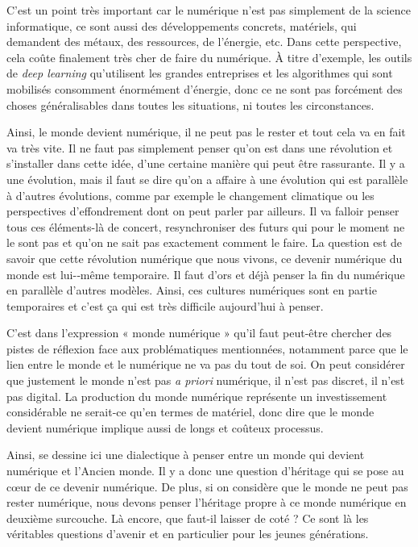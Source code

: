 C'est un point très important car le numérique n'est pas simplement de la science informatique, ce sont aussi des développements concrets, matériels, qui demandent des métaux, des ressources, de l'énergie, etc. Dans cette perspective, cela coûte finalement très cher de faire du numérique. À titre d'exemple, les outils de \textit{deep learning} qu'utilisent les grandes entreprises et les algorithmes qui sont mobilisés consomment énormément d'énergie, donc ce ne sont pas forcément des choses généralisables dans toutes les situations, ni toutes les circonstances. 

Ainsi, le monde devient numérique, il ne peut pas le rester et tout cela va en fait va très vite. Il ne faut pas simplement penser qu'on est dans une révolution et s'installer dans cette idée, d'une certaine manière qui peut être rassurante. Il y a une évolution, mais il faut se dire qu'on a affaire à une évolution qui est parallèle à d'autres évolutions, comme par exemple le changement climatique ou les perspectives d'effondrement dont on peut parler par ailleurs. Il va falloir penser tous ces éléments-là de concert, resynchroniser des futurs qui pour le moment ne le sont pas et qu'on ne sait pas exactement comment le faire. La question est de savoir que cette révolution numérique que nous vivons, ce devenir numérique du monde est lui-­‐même temporaire. Il faut d'ors et déjà penser la 
fin du numérique en parallèle d'autres modèles. Ainsi, ces cultures numériques sont en partie temporaires et c'est ça qui est très difficile aujourd'hui à penser.


C'est dans l'expression « monde numérique » qu'il faut peut-être chercher des pistes de réflexion face aux problématiques mentionnées, notamment parce que le lien entre le monde et le numérique ne va pas du tout de soi. On peut considérer que justement le monde n'est pas \textit{a priori} numérique, il n'est pas discret, il n'est pas \gls{digital}. La production du monde numérique représente un investissement considérable ne serait-ce qu'en termes de matériel, donc dire que le monde devient numérique implique aussi de longs et coûteux processus.

Ainsi, se dessine ici une dialectique à penser entre un monde qui devient numérique et l'Ancien monde. Il y a donc une question d'héritage qui se pose au cœur de ce devenir numérique. De plus, si on considère que le monde ne peut pas rester numérique, nous devons penser l'héritage propre à ce monde numérique en deuxième surcouche. Là encore, que faut-il laisser de coté ? Ce sont là les véritables questions d'avenir et en particulier pour les jeunes générations.


